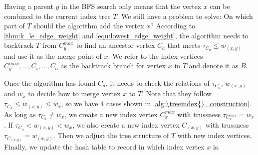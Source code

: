 Having a parent $y$ in the BFS search only means that the vertex $x$ can be combined to the current index tree $T$. We still have a problem to solve: On which part of $T$ should the algorithm add the vertex $x$? According to \autoref{thm:k_le_edge_weight} and \autoref{equ:lowest_edge_weight}, the algorithm needs to backtrack $T$ from $C_{y}^{max}$ to find an ancestor vertex $C_a$ that meets $\tau_{C_a} \le w_{(x,y)}$ and use it as the merge point of $x$. We refer to the index vertices $C_{y}^{max},...,C_{i},...,C_{a}$ as the backtrack branch for vertex $x$ in $T$ and denote it as $B$. %

Once the algorithm has found $C_a$, it needs to check the relations of $\tau_{C_a}$, $w_{(x,y)}$ and $w_{x}$ to decide how to merge vertex $x$ to $T$. Note that they follow $\tau_{C_a} \le w_{(x,y)} \le w_{x}$, so we have 4 cases shown in \autoref{alg:\treeindex{}_construction}. As long as $\tau_{C_a} \neq w_{x}$, we create a new index vertex $C_{x}^{max}$ with trussness $\tau_{C_{x}^{max}} = w_{x}$. If $\tau_{C_a} < w_{(x,y)} < w_{x}$, we also create a new index vertex $C_{(x,y)}$ with trussness $\tau_{C_{(x,y)}} = w_{(x,y)}$. Then we adjust the tree structure of $T$ with new index vertices. Finally, we update the hash table to record in which index vertex $x$ is.

